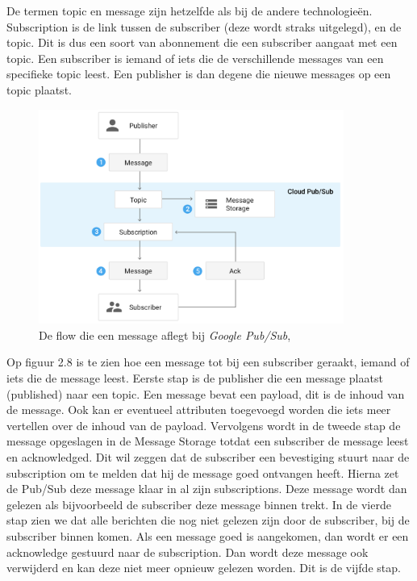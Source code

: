 De termen topic en message zijn hetzelfde als bij de andere technologieën. Subscription is de link tussen de subscriber (deze wordt straks uitgelegd), en de topic. Dit is dus een soort van abonnement die een subscriber aangaat met een topic. Een subscriber is iemand of iets die de verschillende messages van een specifieke topic leest. Een publisher is dan degene die nieuwe messages op een topic plaatst.

 \begin{figure}[h!]
    \centering
    \includegraphics[width=100mm]{../gpsFlow.png}
    \caption{De flow die een message aflegt bij \emph{Google Pub/Sub}, \autocite{Google2019}}
    
\end{figure}

Op figuur 2.8 is te zien hoe een message tot bij een subscriber geraakt, iemand of iets die de message leest. Eerste stap is de publisher die een message plaatst (published) naar een topic. Een message bevat een payload, dit is de inhoud van de message. Ook kan er eventueel attributen toegevoegd worden die iets meer vertellen over de inhoud van de payload. Vervolgens wordt in de tweede stap de message opgeslagen in de Message Storage totdat een subscriber de message leest en acknowledged. Dit wil zeggen dat de subscriber een bevestiging stuurt naar de subscription om te melden dat hij de message goed ontvangen heeft. Hierna zet de Pub/Sub deze message klaar in al zijn subscriptions. Deze message wordt dan gelezen als bijvoorbeeld de subscriber deze message binnen trekt. In de vierde stap zien we dat alle berichten die nog niet gelezen zijn door de subscriber, bij de subscriber binnen komen. Als een message goed is aangekomen, dan wordt er een acknowledge gestuurd naar de subscription. Dan wordt deze message ook verwijderd en kan deze niet meer opnieuw gelezen worden. Dit is de vijfde stap.

